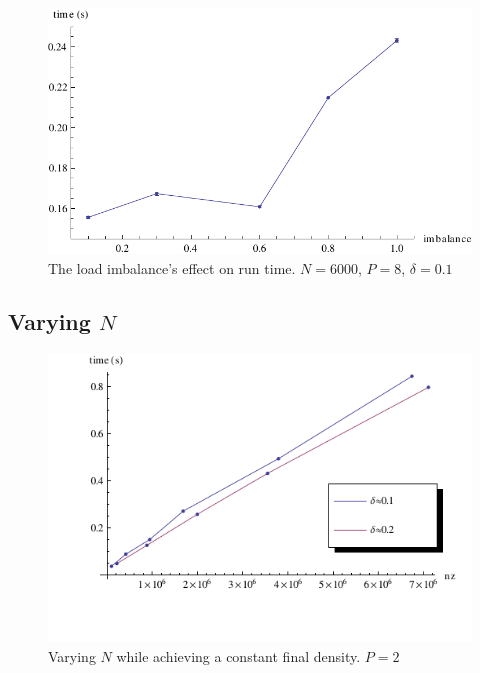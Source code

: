 \documentclass[a4paper]{article}
\begin{document}
\begin{figure}[h]
    \begin{center}
        \includegraphics[width=\plotsize]{img/imbalance.pdf}
    \end{center}
    \caption{The load imbalance's effect on run time. $N=6000$, $P=8$, $\delta=0.1$}
    \label{fig:imbalance}
\end{figure}


\subsection{Varying $N$}\label{sec:nz-run}

\begin{figure}[h]
    \begin{center}
        \includegraphics[width=\plotsize]{img/density-run.pdf}
    \end{center}
    \caption{Varying $N$ while achieving a constant final density. $P=2$}
    \label{fig:density-run}
\end{figure}
\end{document}
